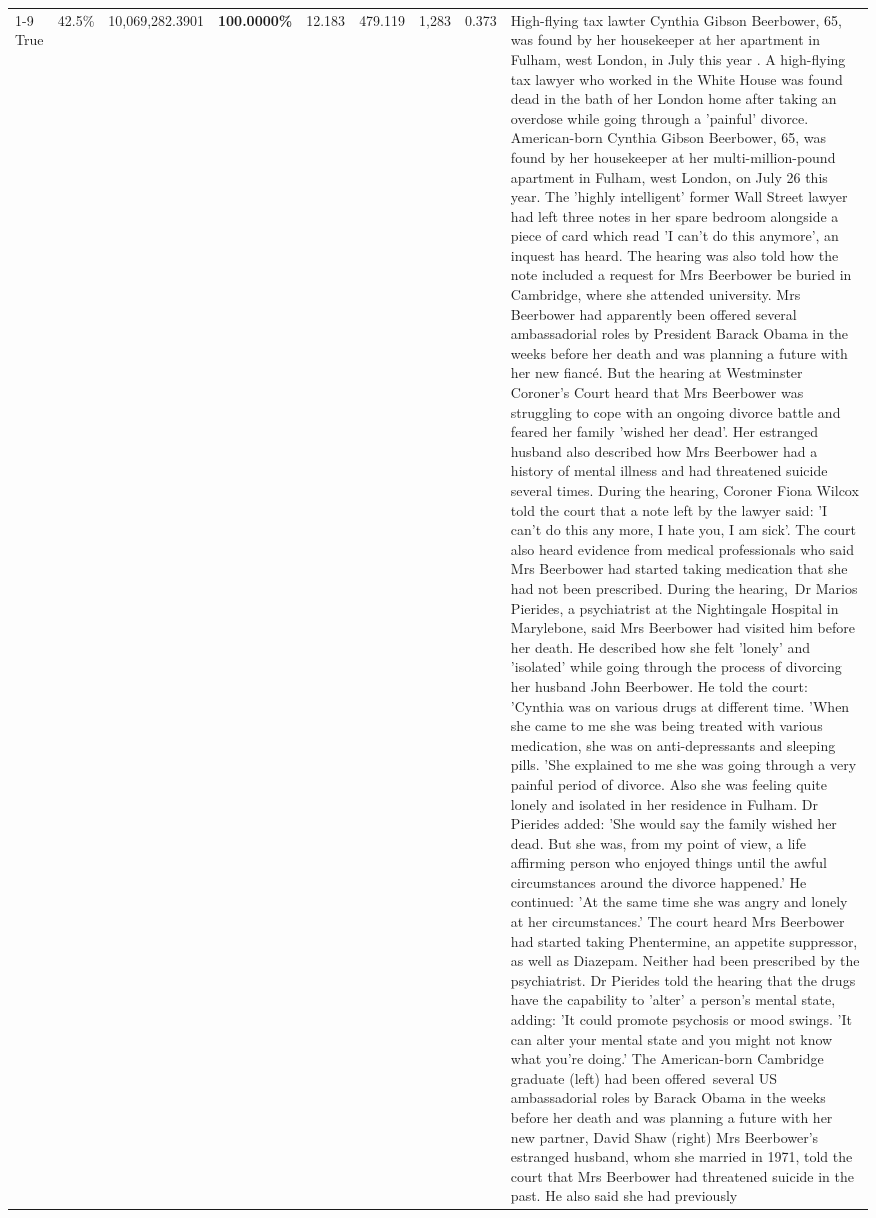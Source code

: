 \begin{table}[H]
\begin{tabular}{lllrlllll}
\cline{1-9}
True & 42.5\% & 10,069,282.3901 & \bfseries \color{red} 100.0000\% & 12.183 & 479.119 & 1,283 & 0.373 & High-flying tax lawter Cynthia Gibson Beerbower, 65, was found by her housekeeper at her apartment in Fulham, west London, in July this year . A high-flying tax lawyer who worked in the White House was found dead in the bath of her London home after taking an overdose while going through a 'painful' divorce. American-born Cynthia Gibson Beerbower, 65, was found by her housekeeper at her multi-million-pound apartment in Fulham, west London, on July 26 this year. The 'highly intelligent' former Wall Street lawyer had left three notes in her spare bedroom alongside a piece of card which read 'I can't do this anymore', an inquest has heard. The hearing was also told how the note included a request for Mrs Beerbower be buried in Cambridge, where she attended university. Mrs Beerbower had apparently been offered several ambassadorial roles by President Barack Obama in the weeks before her death and was planning a future with her new fiancé. But the hearing at Westminster Coroner's Court heard that Mrs Beerbower was struggling to cope with an ongoing divorce battle and feared her family 'wished her dead'. Her estranged husband also described how Mrs Beerbower had a history of mental illness and had threatened suicide several times. During the hearing, Coroner Fiona Wilcox told the court that a note left by the lawyer said: 'I can't do this any more, I hate you, I am sick'. The court also heard evidence from medical professionals who said Mrs Beerbower had started taking medication that she had not been prescribed. During the hearing, Dr Marios Pierides, a psychiatrist at the Nightingale Hospital in Marylebone, said Mrs Beerbower had visited him before her death. He described how she felt 'lonely' and 'isolated' while going through the process of divorcing her husband John Beerbower. He told the court: 'Cynthia was on various drugs at different time. 'When she came to me she was being treated with various medication, she was on anti-depressants and sleeping pills. 'She explained to me she was going through a very painful period of divorce. Also she was feeling quite lonely and isolated in her residence in Fulham. Dr Pierides added: 'She would say the family wished her dead. But she was, from my point of view, a life affirming person who enjoyed things until the awful circumstances around the divorce happened.' He continued: 'At the same time she was angry and lonely at her circumstances.' The court heard Mrs Beerbower had started taking Phentermine, an appetite suppressor, as well as Diazepam. Neither had been prescribed by the psychiatrist. Dr Pierides told the hearing that the drugs have the capability to 'alter' a person's mental state, adding: 'It could promote psychosis or mood swings. 'It can alter your mental state and you might not know what you're doing.' The American-born Cambridge graduate (left) had been offered several US ambassadorial roles by Barack Obama in the weeks before her death and was planning a future with her new partner, David Shaw (right) Mrs Beerbower's estranged husband, whom she married in 1971, told the court that Mrs Beerbower had threatened suicide in the past. He also said she had previously 
\end{tabular}
\end{table}
